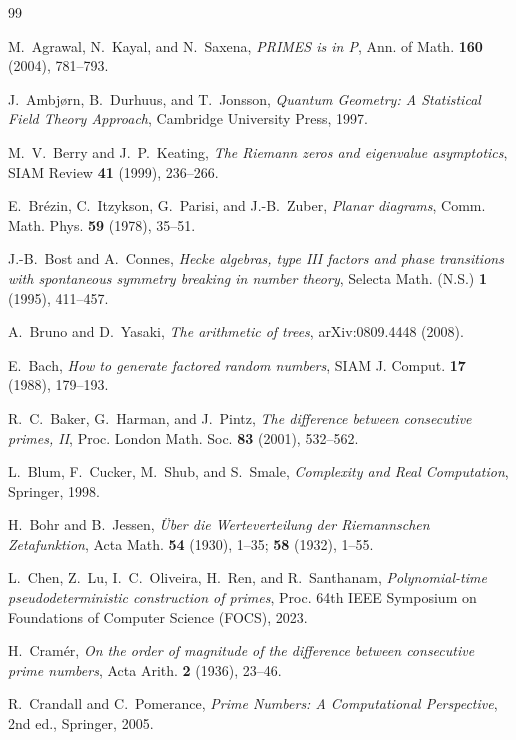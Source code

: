 \documentclass[11pt]{article}
\numberwithin{equation}{section}
\theoremstyle{plain}
\theoremstyle{definition}
\theoremstyle{remark}
\begin{document}
\begin{thebibliography}{99}

M.~Agrawal, N.~Kayal, and N.~Saxena,
\emph{PRIMES is in P},
Ann. of Math. \textbf{160} (2004), 781--793.

J.~Ambj\o rn, B.~Durhuus, and T.~Jonsson,
\emph{Quantum Geometry: A Statistical Field Theory Approach},
Cambridge University Press, 1997.

M.~V.~Berry and J.~P.~Keating,
\emph{The Riemann zeros and eigenvalue asymptotics},
SIAM Review \textbf{41} (1999), 236--266.

E.~Br\'ezin, C.~Itzykson, G.~Parisi, and J.-B.~Zuber,
\emph{Planar diagrams},
Comm. Math. Phys. \textbf{59} (1978), 35--51.

J.-B.~Bost and A.~Connes,
\emph{Hecke algebras, type III factors and phase transitions with spontaneous symmetry
breaking in number theory},
Selecta Math. (N.S.) \textbf{1} (1995), 411--457.

A.~Bruno and D.~Yasaki,
\emph{The arithmetic of trees},
arXiv:0809.4448 (2008).

E.~Bach,
\emph{How to generate factored random numbers},
SIAM J. Comput. \textbf{17} (1988), 179--193.

R.~C.~Baker, G.~Harman, and J.~Pintz,
\emph{The difference between consecutive primes, II},
Proc. London Math. Soc. \textbf{83} (2001), 532--562.

L.~Blum, F.~Cucker, M.~Shub, and S.~Smale,
\emph{Complexity and Real Computation},
Springer, 1998.

H.~Bohr and B.~Jessen,
\emph{\"Uber die Werteverteilung der Riemannschen Zetafunktion},
Acta Math. \textbf{54} (1930), 1--35; \textbf{58} (1932), 1--55.

L.~Chen, Z.~Lu, I.~C.~Oliveira, H.~Ren, and R.~Santhanam,
\emph{Polynomial-time pseudodeterministic construction of primes},
Proc. 64th IEEE Symposium on Foundations of Computer Science (FOCS), 2023.

H.~Cram\'er,
\emph{On the order of magnitude of the difference between consecutive prime numbers},
Acta Arith. \textbf{2} (1936), 23--46.

R.~Crandall and C.~Pomerance,
\emph{Prime Numbers: A Computational Perspective},
2nd ed., Springer, 2005.


\end{thebibliography}
\end{document}
